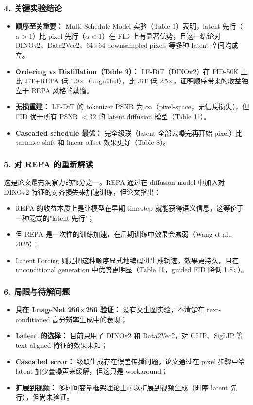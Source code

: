 \subsubsection{4. 关键实验结论}

\begin{itemize}[leftmargin=1.5em]
  \item \textbf{顺序至关重要：} Multi-Schedule Model 实验（Table 1）表明，latent 先行（$\alpha > 1$）比 pixel 先行（$\alpha < 1$）在 FID 上有显著优势，且这一结论对 DINOv2、Data2Vec2、64×64 downsampled pixels 等多种 latent 空间均成立。
  \item \textbf{Ordering vs Distillation（Table 9）：} LF-DiT（DINOv2）在 FID-50K 上比 JiT+REPA 低 1.9×（unguided），比 JiT 低 2.5×，证明顺序带来的收益独立于 REPA 风格的蒸馏。
  \item \textbf{无损重建：} LF-DiT 的 tokenizer PSNR 为 $\infty$（pixel-space，无信息损失），但 FID 优于所有 PSNR $< 32$ 的 latent diffusion 模型（Table 11）。
  \item \textbf{Cascaded schedule 最优：} 完全级联（latent 全部去噪完再开始 pixel）比 variance shift 和 linear offset 效果更好（Table 8）。
\end{itemize}

\subsubsection{5. 对 REPA 的重新解读}

这是论文最有洞察力的部分之一。REPA 通过在 diffusion model 中加入对 DINOv2 特征的对齐损失来加速训练，但论文指出：

\begin{itemize}[leftmargin=1.5em]
  \item REPA 的收益本质上是让模型在早期 timestep 就能获得语义信息，这等价于一种隐式的"latent 先行"；
  \item 但 REPA 是一次性的训练加速，在后期训练中效果会减弱（Wang et al., 2025）；
  \item Latent Forcing 则是把这种顺序显式地编码进生成轨迹，效果更持久，且在 unconditional generation 中优势更明显（Table 10，guided FID 降低 1.8×）。
\end{itemize}

\subsubsection{6. 局限与待解问题}

\begin{itemize}[leftmargin=1.5em]
  \item \textbf{只在 ImageNet 256×256 验证：} 没有文生图实验，不清楚在 text-conditioned 高分辨率生成中的表现；
  \item \textbf{Latent 的选择：} 目前只用了 DINOv2 和 Data2Vec2，对 CLIP、SigLIP 等 text-aligned 特征的效果未知；
  \item \textbf{Cascaded error：} 级联生成存在误差传播问题，论文通过在 pixel 步骤中给 latent 加少量噪声来缓解，但这只是 workaround；
  \item \textbf{扩展到视频：} 多时间变量框架理论上可以扩展到视频生成（时序 latent 先行），但尚未验证。
\end{itemize}

